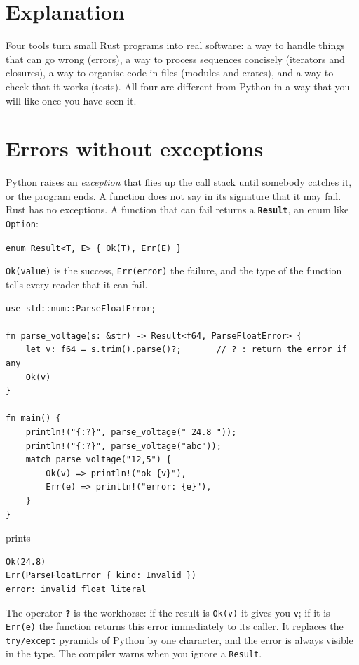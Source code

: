 \label{ch:rust5}

\section*{Explanation}
Four tools turn small Rust programs into real software: a way to handle things that can go wrong (errors), a way to process sequences concisely (iterators and closures), a way to organise code in files (modules and crates), and a way to check that it works (tests). All four are different from Python in a way that you will like once you have seen it.

\section*{Errors without exceptions}
Python raises an \emph{exception} that flies up the call stack until somebody catches it, or the program ends. A function does not say in its signature that it may fail. Rust has no exceptions. A function that can fail returns a \textbf{\texttt{Result}}, an enum like \verb!Option!:
\begin{center}
\verb!enum Result<T, E> { Ok(T), Err(E) }!
\end{center}
\verb!Ok(value)! is the success, \verb!Err(error)! the failure, and the type of the function tells every reader that it can fail.
\begin{verbatim}
use std::num::ParseFloatError;

fn parse_voltage(s: &str) -> Result<f64, ParseFloatError> {
    let v: f64 = s.trim().parse()?;       // ? : return the error if any
    Ok(v)
}

fn main() {
    println!("{:?}", parse_voltage(" 24.8 "));
    println!("{:?}", parse_voltage("abc"));
    match parse_voltage("12,5") {
        Ok(v) => println!("ok {v}"),
        Err(e) => println!("error: {e}"),
    }
}
\end{verbatim}
prints
\begin{verbatim}
Ok(24.8)
Err(ParseFloatError { kind: Invalid })
error: invalid float literal
\end{verbatim}
The operator \textbf{\texttt{?}} is the workhorse: if the result is \verb!Ok(v)! it gives you \verb!v!; if it is \verb!Err(e)! the function returns this error immediately to its caller. It replaces the \verb!try/except! pyramids of Python by one character, and the error is always visible in the type. The compiler warns when you ignore a \verb!Result!.

